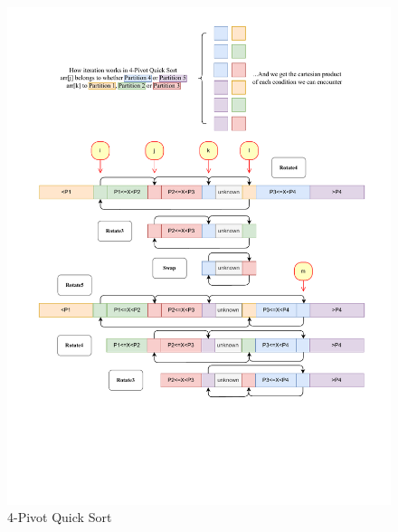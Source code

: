 \documentclass{article}
\begin{document}
\begin{figure}[H]
    \hypertarget{fig:4pivot}{}
    \caption{4-Pivot Quick Sort}
    \centering
    \hspace*{-0.25\textwidth}
    \includegraphics[width=1.5\textwidth]{4pivot.drawio.pdf}
\end{figure}
\end{document}
